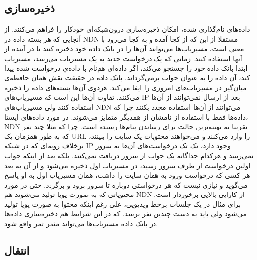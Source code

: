 \subsection{ذخیره‌سازی}
داده‌های نام‌گذاری شده، امکان ذخیره‌سازی درون‌شبکه‌ای خودکار را فراهم‌ می‌کنند. از آنجایی که هر بسته داده در NDN مستقلا از این که از کجا آمده و به کجا می‌رود با معنی است، مسیریاب‌ها می‌توانند آن‌ها را در بانک داده خود ذخیره کنند تا در آینده از آنها استفاده کنند. زمانی که یک درخواست جدید به یک مسیریاب می‌رسد، مسیریاب ابتدا بانک داده خود را جستجو می‌کند، اگر داده‌ای هم‌نام با داده‌ي درخواست شده پیدا کند، آن داده را به عنوان جواب برمی‌گرداند. بانک داده در حقیقت نقش همان حافظه‌‌ی میان‌گیر در مسیریاب‌های امروزی را ایفا می‌کند. هردوی آن‌ها بسته‌‌های داده را ذخیره‌ می‌کنند. تفاوت آن‌ها این است که مسیریاب‌‌های IP بعد از ارسال نمی‌توانند از آن‌ها استفاده کنند ولی مسیریاب‌های NDN  می‌توانند از آن‌ها استفاده مجدد بکنند چرا که داده‌‌ها فقط با استفاده از نامشان از همدیگر متمایز می‌شوند. در مورد داده‌های ایستا، NDN تقریبا به بهینه‌ترین حالت برای رساندن پیام‌ها رسیده است. چرا که مثلا چند نفر که به طور همزمان یک URL را وارد می‌کنند و می‌خواهند محتویات یک سایت را ببینند، برخلاف رویه‌ای که در شبکه IP وجود دارد، تک تک درخواست‌های آن‌ها به سرور نمی‌رسد و هرکدام جداگانه یک جواب از سرور دریافت نمی‌کنند. بلکه بعد از اینکه جواب اولین درخواست از طرف سرور رسید، در مسیریاب اول ذخیره می‌شود و از آن به بعد هر کسی که درخواست ورود به همان سایت را داشت، همان مسیریاب اول به او پاسخ می‌گوید و نیازی نیست که هر درخواستی دوباره تا سرور برود و برگردد. حتی در مورد محتویاتی که به صورت پویا تولید می‌شوند هم NDN از کارایی بالایی برخوردار است. برای مثال در یک جلسات برخط ویدیویی، علی رغم اینکه محتوا به صورت پویا تولید می‌شود ولی باید به دست چندین نفر برسد. که در این شرایط هم ذخیره‌سازی داده‌ها در بانک داده مسیریاب‌ها می‌تواند مثمر ثمر واقع شود. 

\subsection{انتقال}